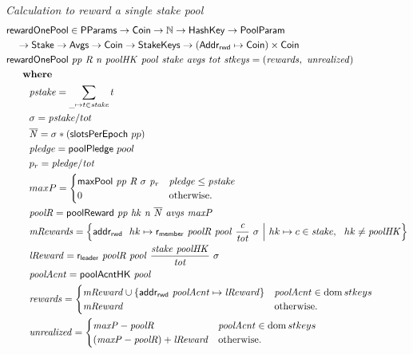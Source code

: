 \begin{figure}[htb]
  \emph{Calculation to reward a single stake pool}
  \begin{align*}
      & \mathsf{rewardOnePool} \in \mathsf{PParams} \to \mathsf{Coin} \to \mathbb{N} \to \mathsf{HashKey} \to \mathsf{PoolParam}\\
      & ~~~\to \mathsf{Stake} \to \mathsf{Avgs} \to \mathsf{Coin} \to \mathsf{StakeKeys} \to (\mathsf{Addr_{rwd}} \mapsto \mathsf{Coin})\times\mathsf{Coin} \\
      & \mathsf{rewardOnePool}~\mathit{pp}~\mathit{R}~\mathit{n}~\mathit{poolHK}~\mathit{pool}~\mathit{stake}~\mathit{avgs}~\mathit{tot}~\mathit{stkeys} =
          (\mathit{rewards},~\mathit{unrealized})\\
      & ~~~~ ~ \mathbf{where}~ ~  \\
      & ~~~~~~~\mathit{pstake} = \sum_{\_\mapsto t\in\mathit{stake}} t \\
      & ~~~~~~~\sigma = \mathit{pstake} / tot \\
      & ~~~~~~~\mathit{\overline{N}} = \sigma * (\mathsf{slotsPerEpoch}~{pp})\\
      & ~~~~~~~\mathit{pledge} = \mathsf{poolPledge}~pool \\
      & ~~~~~~~p_{r} = \mathit{pledge} / \mathit{tot} \\
      & ~~~~~~~maxP =
      \begin{cases}
        \mathsf{maxPool}~\mathit{pp}~\mathit{R}~\sigma~\mathit{p_r}&
        \mathit{pledge} \leq \mathit{pstake}\\
        0 & \text{otherwise.}
      \end{cases} \\
      & ~~~~~~~\mathit{poolR} = \mathsf{poolReward}~\mathit{pp}~\mathit{hk}~\mathit{n}~\mathit{\overline{N}}~\mathit{avgs}~\mathit{maxP} \\
      & ~~~~~~~\mathit{mRewards} = \left\{
                                  \mathsf{addr_{rwd}}~ \mathit{~}hk\mapsto\mathsf{r_{member}}~ \mathit{poolR}~ \mathit{pool}~ \mathit{\frac{c}{tot}}~ {\sigma}
                                  ~\Big\vert~
                                  hk\mapsto c\in\mathit{stake},~~hk \neq\mathit{poolHK}
                               \right\}\\
      & ~~~~~~~\mathit{lReward} = \mathsf{r_{leader}}~ \mathit{poolR}~ \mathit{pool}~ \mathit{\frac{\mathit{stake}~\mathit{poolHK}}{tot}}~ {\sigma} \\
      & ~~~~~~~\mathit{poolAcnt} = \mathsf{poolAcntHK}~\mathit{pool} \\
      & ~~~~~~~\mathit{rewards} =
                 \begin{cases}
                   \mathit{mReward}\cup\{\mathsf{addr_{rwd}}~ \mathit{\mathit{poolAcnt}}\mapsto\mathit{lReward}\}
                   & \mathit{poolAcnt} \in \operatorname{dom}{stkeys} \\
                   \mathit{mReward} & \text{otherwise.} \\
                 \end{cases} \\
      & ~~~~~~~\mathit{unrealized} =
                 \begin{cases}
                   \mathit{maxP} - \mathit{poolR} & \mathit{poolAcnt} \in \operatorname{dom}{stkeys} \\
                   (\mathit{maxP} - \mathit{poolR})+\mathit{lReward} & \text{otherwise.} \\
                 \end{cases} \\
  \end{align*}


\end{figure}

